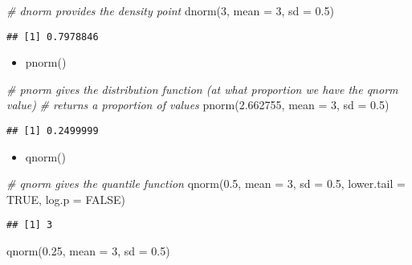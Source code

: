 \documentclass[
]{article}
\newenvironment{Shaded}{\begin{snugshade}}{\end{snugshade}}
\newcommand{\AttributeTok}[1]{\textcolor[rgb]{0.77,0.63,0.00}{#1}}
\newcommand{\CommentTok}[1]{\textcolor[rgb]{0.56,0.35,0.01}{\textit{#1}}}
\newcommand{\ConstantTok}[1]{\textcolor[rgb]{0.00,0.00,0.00}{#1}}
\newcommand{\DecValTok}[1]{\textcolor[rgb]{0.00,0.00,0.81}{#1}}
\newcommand{\FloatTok}[1]{\textcolor[rgb]{0.00,0.00,0.81}{#1}}
\newcommand{\FunctionTok}[1]{\textcolor[rgb]{0.00,0.00,0.00}{#1}}
\newcommand{\NormalTok}[1]{#1}
\providecommand{\tightlist}{%
  \setlength{\itemsep}{0pt}\setlength{\parskip}{0pt}}
\begin{document}
\begin{Shaded}
\begin{Highlighting}[]
\CommentTok{\# dnorm provides the density point}
\FunctionTok{dnorm}\NormalTok{(}\DecValTok{3}\NormalTok{, }\AttributeTok{mean =} \DecValTok{3}\NormalTok{, }\AttributeTok{sd =} \FloatTok{0.5}\NormalTok{)}
\end{Highlighting}
\end{Shaded}

\begin{verbatim}
## [1] 0.7978846
\end{verbatim}

\begin{itemize}
\tightlist
\item
  pnorm()
\end{itemize}

\begin{Shaded}
\begin{Highlighting}[]
\CommentTok{\# pnorm gives the distribution function (at what proportion we have the qnorm value)}
\CommentTok{\# returns a proportion of values}
\FunctionTok{pnorm}\NormalTok{(}\FloatTok{2.662755}\NormalTok{, }\AttributeTok{mean =} \DecValTok{3}\NormalTok{, }\AttributeTok{sd =} \FloatTok{0.5}\NormalTok{)}
\end{Highlighting}
\end{Shaded}

\begin{verbatim}
## [1] 0.2499999
\end{verbatim}

\begin{itemize}
\tightlist
\item
  qnorm()
\end{itemize}

\begin{Shaded}
\begin{Highlighting}[]
\CommentTok{\# qnorm gives the quantile function}
\FunctionTok{qnorm}\NormalTok{(}\FloatTok{0.5}\NormalTok{, }\AttributeTok{mean =} \DecValTok{3}\NormalTok{, }\AttributeTok{sd =} \FloatTok{0.5}\NormalTok{, }\AttributeTok{lower.tail =} \ConstantTok{TRUE}\NormalTok{, }\AttributeTok{log.p =} \ConstantTok{FALSE}\NormalTok{)}
\end{Highlighting}
\end{Shaded}

\begin{verbatim}
## [1] 3
\end{verbatim}

\begin{Shaded}
\begin{Highlighting}[]
\FunctionTok{qnorm}\NormalTok{(}\FloatTok{0.25}\NormalTok{, }\AttributeTok{mean =} \DecValTok{3}\NormalTok{, }\AttributeTok{sd =} \FloatTok{0.5}\NormalTok{)}
\end{Highlighting}
\end{Shaded}
\end{document}
